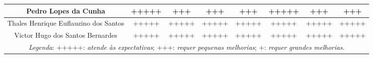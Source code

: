 \begin{landscape}
\begin{table}[htpb]
\begin{center}
\begin{tabular}{|c|c|c|c|c|c|c|c|}
Pedro Lopes da Cunha & +++++ & +++ & +++ & +++ & +++++ & +++ & +++ \\ \hline
Thales Henrique Euflauzino dos Santos & +++++ & +++++ & +++++ & +++++ & +++++ & +++++ & +++++ \\ \hline
Victor Hugo dos Santos Bernardes & +++++ & +++++ & +++++ & +++++ & +++++ & +++++ & +++++ \\ \hline
\multicolumn{8}{c}{\textit{Legenda}: +++++: \textit{atende às expectativas}; +++: \textit{requer pequenas melhorias}; +: \textit{requer grandes melhorias}.} 
\end{tabular}
\end{center}
\end{table}


\end{landscape}